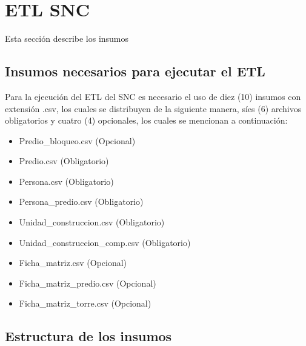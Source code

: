 \documentclass[letterpaper,10pt,spanish]{sphinxmanual}
\begin{document}
\chapter{ETL SNC}
\label{\detokenize{ETL SNC:etl-snc}}\label{\detokenize{ETL SNC::doc}}
Esta sección describe los insumos


\section{Insumos necesarios para ejecutar el ETL}
\label{\detokenize{ETL_SNC/supplies:insumos-necesarios-para-ejecutar-el-etl}}\label{\detokenize{ETL_SNC/supplies::doc}}
Para la ejecución del ETL del SNC es necesario el uso de diez (10) insumos con extensión .csv, los cuales se distribuyen
de la siguiente manera, síes (6) archivos obligatorios y cuatro (4) opcionales, los cuales se mencionan a continuación:
\begin{itemize}
\item {} 
Predio\_bloqueo.csv \sphinxhyphen{} (Opcional)

\item {} 
Predio.csv \sphinxhyphen{} (Obligatorio)

\item {} 
Persona.csv \sphinxhyphen{} (Obligatorio)

\item {} 
Persona\_predio.csv \sphinxhyphen{} (Obligatorio)

\item {} 
Unidad\_construccion.csv \sphinxhyphen{} (Obligatorio)

\item {} 
Unidad\_construccion\_comp.csv \sphinxhyphen{} (Obligatorio)

\item {} 
Ficha\_matriz.csv \sphinxhyphen{} (Opcional)

\item {} 
Ficha\_matriz\_predio.csv \sphinxhyphen{} (Opcional)

\item {} 
Ficha\_matriz\_torre.csv \sphinxhyphen{} (Opcional)

\end{itemize}


\section{Estructura de los insumos}
\label{\detokenize{ETL_SNC/Structure:estructura-de-los-insumos}}\label{\detokenize{ETL_SNC/Structure::doc}}
\end{document}
